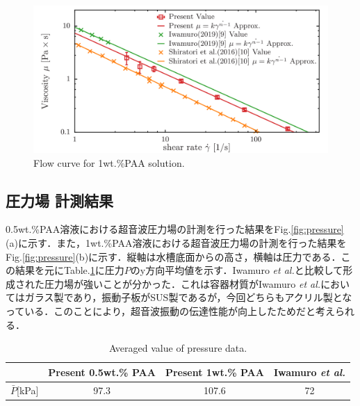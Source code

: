 \begin{figure}[ht]
    \centering
    \includegraphics[width=12cm,clip]{4-Results/PAA-viscosity.png}
    \caption{Flow curve for 1wt.\%PAA solution.}
    \label{fig:PAA-vis}
\end{figure}

\newpage

\subsection{圧力場 計測結果}

0.5wt.\%PAA溶液における超音波圧力場の計測を行った結果をFig.\ref{fig:pressure}(a)に示す．また，1wt.\%PAA溶液における超音波圧力場の計測を行った結果をFig.\ref{fig:pressure}(b)に示す．縦軸は水槽底面からの高さ，横軸は圧力である．この結果を元にTable.\ref{table:press}に圧力$P$のy方向平均値を示す．Iwamuro {\it et al.}\cite{ref:8}と比較して形成された圧力場が強いことが分かった．これは容器材質がIwamuro {\it et al.}\cite{ref:8}においてはガラス製であり，振動子板がSUS製であるが，今回どちらもアクリル製となっている．このことにより，超音波振動の伝達性能が向上したためだと考えられる．

\begin{table}[h]
    \centering
    \caption{Averaged value of pressure data.}
    \label{table:press}
    \begin{tabular}{c|c|c|c}\hline
                       & Present 0.5wt.\% PAA & Present 1wt.\% PAA & Iwamuro {\it et al.}\cite{ref:8} \\ \hline
        $\bar{P}$[kPa] & 97.3                 & 107.6              & 72                               \\ \hline
    \end{tabular}
\end{table}

